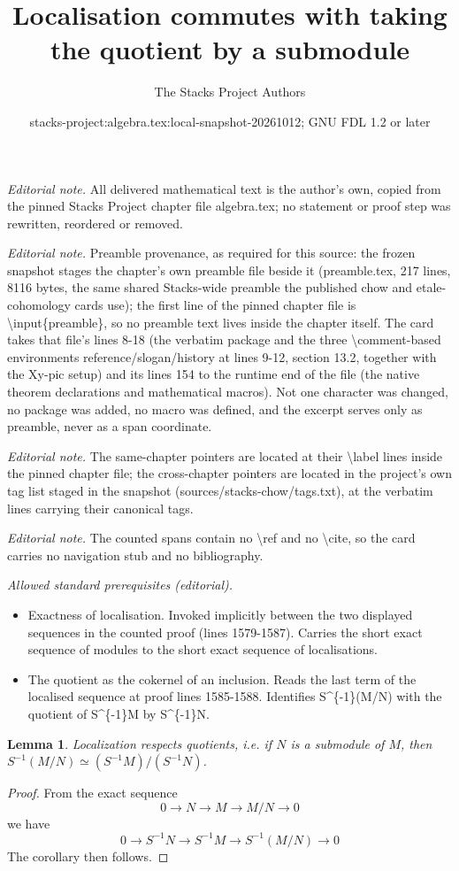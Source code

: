 \documentclass[10pt,a4paper]{amsart}
\title{Localisation commutes with taking the quotient by a submodule}
\author{The Stacks Project Authors}
\date{stacks-project:algebra.tex:local-snapshot-20261012; GNU FDL 1.2 or later}
\theoremstyle{plain}
\newtheorem{lemma}[subsection]{Lemma}
\theoremstyle{definition}
\theoremstyle{remark}
\numberwithin{equation}{subsection}
\begin{document}
\maketitle
\noindent\textit{Editorial note.} All delivered mathematical text is the author's own, copied from the pinned Stacks Project chapter file algebra.tex; no statement or proof step was rewritten, reordered or removed.\par\medskip
\noindent\textit{Editorial note.} Preamble provenance, as required for this source: the frozen snapshot stages the chapter's own preamble file beside it (preamble.tex, 217 lines, 8116 bytes, the same shared Stacks-wide preamble the published chow and etale-cohomology cards use); the first line of the pinned chapter file is \textbackslash{}input\{preamble\}, so no preamble text lives inside the chapter itself. The card takes that file's lines 8-18 (the verbatim package and the three \textbackslash{}comment-based environments reference/slogan/history at lines 9-12, section 13.2, together with the Xy-pic setup) and its lines 154 to the runtime end of the file (the native theorem declarations and mathematical macros). Not one character was changed, no package was added, no macro was defined, and the excerpt serves only as preamble, never as a span coordinate.\par\medskip
\noindent\textit{Editorial note.} The same-chapter pointers are located at their \textbackslash{}label lines inside the pinned chapter file; the cross-chapter pointers are located in the project's own tag list staged in the snapshot (sources/stacks-chow/tags.txt), at the verbatim lines carrying their canonical tags.\par\medskip
\noindent\textit{Editorial note.} The counted spans contain no \textbackslash{}ref and no \textbackslash{}cite, so the card carries no navigation stub and no bibliography.\par\medskip
\noindent\textit{Allowed standard prerequisites (editorial).}\begin{itemize}
\item Exactness of localisation. Invoked implicitly between the two displayed sequences in the counted proof (lines 1579-1587). Carries the short exact sequence of modules to the short exact sequence of localisations.
\item The quotient as the cokernel of an inclusion. Reads the last term of the localised sequence at proof lines 1585-1588. Identifies S\textasciicircum{}\{-1\}(M/N) with the quotient of S\textasciicircum{}\{-1\}M by S\textasciicircum{}\{-1\}N.
\end{itemize}\medskip
\begin{lemma}
\label{lemma-localize-quotient-modules}
Localization respects quotients, i.e. if $N$ is a submodule of
$M$, then $S^{-1}(M/N)\simeq (S^{-1}M)/(S^{-1}N)$.
\end{lemma}

\begin{proof}
From the exact sequence
$$
0 \longrightarrow N \longrightarrow M \longrightarrow M/N \longrightarrow 0
$$
we have
$$
0 \longrightarrow S^{-1}N \longrightarrow S^{-1}M
\longrightarrow S^{-1}(M/N) \longrightarrow 0
$$
The corollary then follows.
\end{proof}
\end{document}
